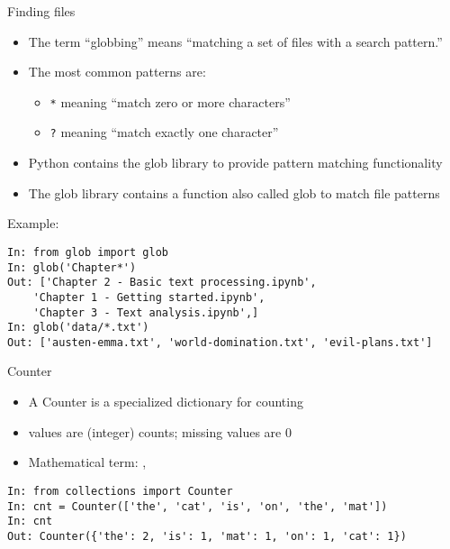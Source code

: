 \documentclass[aspectratio=169,usenames,dvipsnames]{beamer}
\begin{document}
\begin{frame}[fragile]{Finding files}
    \begin{itemize}
        \item The term ``globbing'' means ``matching a set of files with a search pattern.''
        \item The most common patterns are:
            \begin{itemize}
                \item \texttt{*} meaning ``match zero or more characters''
                \item \texttt{?} meaning ``match exactly one character''
            \end{itemize}
        \item Python contains the glob library to provide pattern matching functionality
        \item The glob library contains a function also called glob to match
            file patterns
    \end{itemize}
\pause
Example:
\begin{lstlisting}
In: from glob import glob
In: glob('Chapter*')
Out: ['Chapter 2 - Basic text processing.ipynb',
    'Chapter 1 - Getting started.ipynb',
    'Chapter 3 - Text analysis.ipynb',]
In: glob('data/*.txt')
Out: ['austen-emma.txt', 'world-domination.txt', 'evil-plans.txt']
\end{lstlisting}
\end{frame}

\begin{frame}[fragile]{Counter}
\begin{itemize}
\item A Counter is a specialized dictionary for counting
\item values are (integer) counts; missing values are 0
\item Mathematical term: , 
\end{itemize}

\begin{lstlisting}
In: from collections import Counter
In: cnt = Counter(['the', 'cat', 'is', 'on', 'the', 'mat'])
In: cnt
Out: Counter({'the': 2, 'is': 1, 'mat': 1, 'on': 1, 'cat': 1})
\end{lstlisting}
\end{frame}
\end{document}
